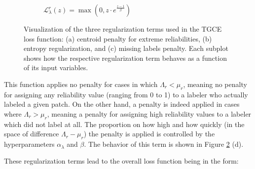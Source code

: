 \begin{figure}[H]
  \vspace{0.5cm}

  \begin{subfigure}[b]{0.48\textwidth}
    \centering
    \caption{$\mathcal{L}_{\lambda}^r(z) = \max(0,
    z \cdot e^{\frac{z-1}{\beta}})$}
    \label{fig:missing_labels_penalizing}
  \end{subfigure}

  \caption{Visualization of the three regularization terms used in the
    TGCE loss function:
    (a) centroid penalty for extreme reliabilities, (b) entropy regularization,
    and (c) missing labels penalty.
    Each subplot shows
    how the respective regularization term behaves as a function of its
  input variables.}
  \label{fig:regularization_terms}
\end{figure}

This function applies no penalty for cases in which  $\Lambda_r <
\mu_r$, meaning no penalty for assigning any reliability value
(ranging from 0 to 1) to a labeler who actually labeled a given patch.
On the other hand, a penalty is indeed applied in cases where
$\Lambda_r > \mu_r$, meaning a penalty for assigning high reliability
values to a labeler which did not label at all. The proportion on how
high and how quickly (in the space of difference $\Lambda_r - \mu_r$)
the penalty is applied is controlled by the hyperparameters $\alpha_{\lambda}$
and $\beta$. The behavior of this term is shown in Figure
\ref{fig:regularization_terms} (d).

These regularization terms lead to the overall loss function being in the form:

